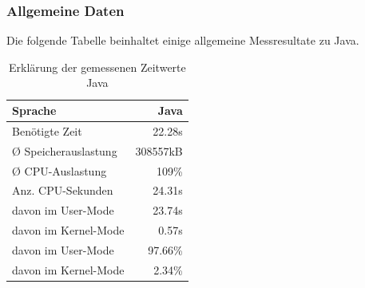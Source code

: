 \documentclass{fancydocument}
\begin{document}
\subsubsection{Allgemeine Daten}
Die folgende Tabelle beinhaltet einige allgemeine Messresultate zu Java. 
\begin{table}[h!]
\centering
\begin{tabular}{|p{6cm}|r|} \hline
Sprache & Java\\
\hline
Benötigte Zeit & 22.28s\\
\hline
Ø Speicherauslastung & 308557kB\\
\hline
Ø CPU-Auslastung & 109\%\\
\hline
Anz. CPU-Sekunden & 24.31s\\
\hline
davon im User-Mode & 23.74s\\
\hline
davon im Kernel-Mode & 0.57s\\
\hline
davon im User-Mode & 97.66\%\\
\hline
davon im Kernel-Mode & 2.34\%\\
\hline
\end{tabular}
\caption{Erklärung der gemessenen Zeitwerte Java}
\end{table}
\end{document}
